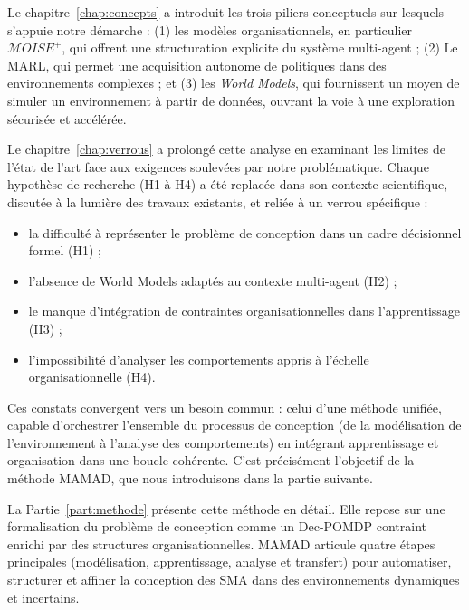 \medskip

\noindent
Le chapitre~\autoref{chap:concepts} a introduit les trois piliers conceptuels sur lesquels s'appuie notre démarche : (1) les modèles organisationnels, en particulier \textit{$\mathcal{M}OISE^+$}, qui offrent une structuration explicite du système multi-agent ; (2) Le \ac{MARL}, qui permet une acquisition autonome de politiques dans des environnements complexes ; et (3) les \textit{World Models}, qui fournissent un moyen de simuler un environnement à partir de données, ouvrant la voie à une exploration sécurisée et accélérée.

\noindent
Le chapitre~\autoref{chap:verrous} a prolongé cette analyse en examinant les limites de l'état de l'art face aux exigences soulevées par notre problématique. Chaque hypothèse de recherche (H1 à H4) a été replacée dans son contexte scientifique, discutée à la lumière des travaux existants, et reliée à un verrou spécifique :
\begin{itemize}
    \item la difficulté à représenter le problème de conception dans un cadre décisionnel formel (H1) ;
    \item l'absence de World Models adaptés au contexte multi-agent (H2) ;
    \item le manque d'intégration de contraintes organisationnelles dans l'apprentissage (H3) ;
    \item l'impossibilité d'analyser les comportements appris à l'échelle organisationnelle (H4).
\end{itemize}

\medskip

\noindent
Ces constats convergent vers un besoin commun : celui d'une méthode unifiée, capable d'orchestrer l'ensemble du processus de conception (de la modélisation de l'environnement à l'analyse des comportements) en intégrant apprentissage et organisation dans une boucle cohérente. C'est précisément l'objectif de la méthode \ac{MAMAD}, que nous introduisons dans la partie suivante.

\noindent
La Partie~\autoref{part:methode} présente cette méthode en détail. Elle repose sur une formalisation du problème de conception comme un \ac{Dec-POMDP} contraint enrichi par des structures organisationnelles. \ac{MAMAD} articule quatre étapes principales (modélisation, apprentissage, analyse et transfert) pour automatiser, structurer et affiner la conception des \ac{SMA} dans des environnements dynamiques et incertains.

